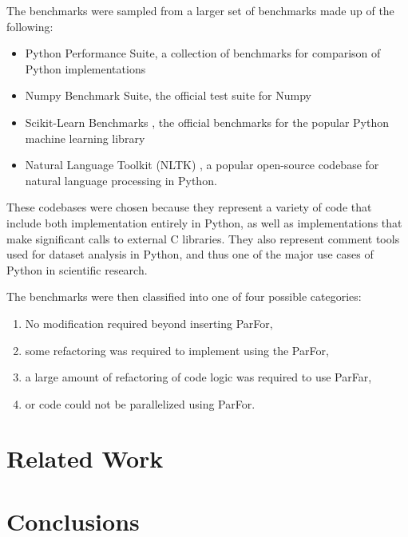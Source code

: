 \documentclass[conference]{IEEEtran}
\begin{document}
The benchmarks were sampled from a larger set of benchmarks made up of the following:
\begin{itemize}
   \item Python Performance Suite\cite{pyPerformance}, a collection of benchmarks for comparison of Python implementations
   \item Numpy Benchmark Suite\cite{numpyPerformance}, the official test suite for Numpy
   \item Scikit-Learn Benchmarks \cite{scikit-learn}, the official benchmarks for the popular Python machine learning library
   \item Natural Language Toolkit (NLTK) \cite{bird_2016}, a popular open-source codebase for natural language processing in Python.
\end{itemize}
These codebases were chosen because they represent a variety of code that include both implementation entirely in Python, as well as implementations that make significant calls to external C libraries. 
They also represent comment tools used for dataset analysis in Python, and thus one of the major use cases of Python in scientific research.



The benchmarks were then classified into one of four possible categories:
\begin{enumerate}
   \item No modification required beyond inserting ParFor,
   \item some refactoring was required to implement using the ParFor, 
   \item a large amount of refactoring of code logic was required to use ParFar,
   \item or code could not be parallelized using ParFor.
\end{enumerate}



\section{Related Work}

\section{Conclusions}




\end{document}

